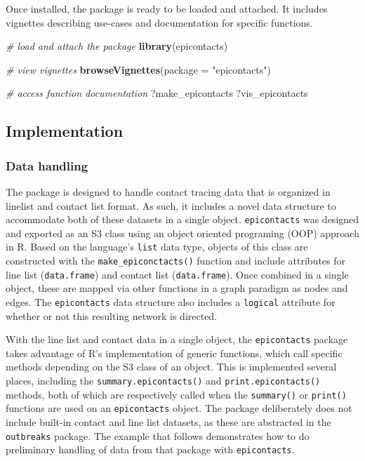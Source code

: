 \documentclass[9pt,a4paper,]{extarticle}
\newenvironment{Shaded}{\begin{snugshade}}{\end{snugshade}}
\newcommand{\KeywordTok}[1]{\textcolor[rgb]{0.13,0.29,0.53}{\textbf{#1}}}
\newcommand{\DataTypeTok}[1]{\textcolor[rgb]{0.13,0.29,0.53}{#1}}
\newcommand{\StringTok}[1]{\textcolor[rgb]{0.31,0.60,0.02}{#1}}
\newcommand{\CommentTok}[1]{\textcolor[rgb]{0.56,0.35,0.01}{\textit{#1}}}
\newcommand{\NormalTok}[1]{#1}
\theoremstyle{definition}
\theoremstyle{definition}
\theoremstyle{definition}
\theoremstyle{remark}
\begin{document}
Once installed, the package is ready to be loaded and attached. It includes vignettes describing use-cases and documentation for specific functions.

\begin{Shaded}
\begin{Highlighting}[]
\CommentTok{# load and attach the package}
\KeywordTok{library}\NormalTok{(epicontacts)}
\end{Highlighting}
\end{Shaded}

\begin{Shaded}
\begin{Highlighting}[]
\CommentTok{# view vignettes}
\KeywordTok{browseVignettes}\NormalTok{(}\DataTypeTok{package =} \StringTok{"epicontacts"}\NormalTok{)}

\CommentTok{# access function documentation}
\NormalTok{?make_epicontacts}
\NormalTok{?vis_epicontacts}
\end{Highlighting}
\end{Shaded}

\subsection{Implementation}\label{implementation}

\subsubsection{Data handling}\label{data-handling}

The package is designed to handle contact tracing data that is organized in linelist and contact list format. As such, it includes a novel data structure to accommodate both of these datasets in a single object. \texttt{epicontacts} was designed and exported as an S3 class using an object oriented programing (OOP) approach in R. Based on the language's \texttt{list} data type, objects of this class are constructed with the \texttt{make\_epiconctacts()} function and include attributes for line list (\texttt{data.frame}) and contact list (\texttt{data.frame}). Once combined in a single object, these are mapped via other functions in a graph paradigm as nodes and edges. The \texttt{epicontacts} data structure also includes a \texttt{logical} attribute for whether or not this resulting network is directed.

With the line list and contact data in a single object, the \texttt{epicontacts} package takes advantage of R's implementation of generic functions, which call specific methods depending on the S3 class of an object. This is implemented several places, including the \texttt{summary.epicontacts()} and \texttt{print.epicontacts()} methods, both of which are respectively called when the \texttt{summary()} or \texttt{print()} functions are used on an \texttt{epicontacts} object. The package deliberately does not include built-in contact and line list datasets, as these are abstracted in the \texttt{outbreaks} package\citep{outbreaks}. The example that follows demonstrates how to do preliminary handling of data from that package with \texttt{epicontacts}.
\end{document}
